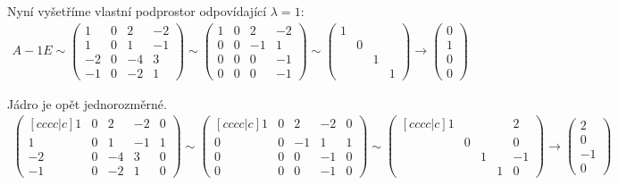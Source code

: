 \documentclass[]{article}
\begin{document}
\medskip
\medskip

Nyní vyšetříme vlastní podprostor odpovídající $\lambda=1$:
\begin{align*}
    A-1E \sim
    \begin{pmatrix}
        1 & 0 & 2 & -2 \\
        1 & 0 & 1 & -1 \\
        -2 & 0 & -4 & 3 \\
        -1 & 0 & -2 & 1
    \end{pmatrix} \sim
    \begin{pmatrix}
        1 & 0 & 2 & -2 \\
        0 & 0 & -1 & 1 \\
        0 & 0 & 0 & -1 \\
        0 & 0 & 0 & -1
    \end{pmatrix} \sim
    \begin{pmatrix}
        1 & & & \\
        & 0 & & \\
        & & 1 & \\
        & & & 1
    \end{pmatrix}
    \rightarrow
    \begin{pmatrix}
        0 \\ 1 \\ 0 \\ 0
    \end{pmatrix}
\end{align*}

\medskip
\medskip

Jádro je opět jednorozměrné.
\begin{align*}
    \begin{pmatrix}[cccc|c]
        1 & 0 & 2 & -2 & 0\\
        1 & 0 & 1 & -1 & 1\\
        -2 & 0 & -4 & 3 & 0\\
        -1 & 0 & -2 & 1 & 0
    \end{pmatrix} \sim
    \begin{pmatrix}[cccc|c]
        1 & 0 & 2 & -2 & 0\\
        0 & 0 & -1 & 1 & 1\\
        0 & 0 & 0 & -1 & 0\\
        0 & 0 & 0 & -1 & 0
    \end{pmatrix} \sim
    \begin{pmatrix}[cccc|c]
        1 & & & & 2\\
        & 0 & & & 0\\
        & & 1 & & -1\\
        & & & 1 & 0
    \end{pmatrix}
    \rightarrow
    \begin{pmatrix}
        2 \\ 0 \\ -1 \\ 0
    \end{pmatrix}
\end{align*}
\end{document}
